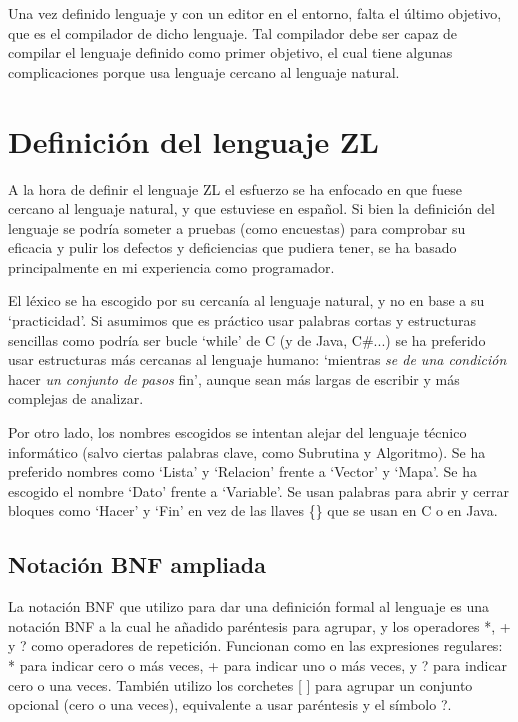 \documentclass{report}
\begin{document}
	\vspace{10px}
	
	Una vez definido lenguaje y  con un editor en el entorno, falta el último objetivo, que es el compilador de dicho lenguaje. Tal compilador debe ser capaz de compilar el lenguaje definido como primer objetivo, el cual tiene algunas complicaciones porque usa lenguaje cercano al lenguaje natural.
	
	\section{Definición del lenguaje ZL}
	
	A la hora de definir el lenguaje ZL el esfuerzo se ha enfocado en que fuese cercano al lenguaje natural, y que estuviese en español\cite{mundoingles}. Si bien la definición del lenguaje se podría someter a pruebas (como encuestas) para comprobar su eficacia y pulir los defectos y deficiencias que pudiera tener, se ha basado principalmente en mi experiencia como programador. 
	
	\vspace{10px}
	
	El léxico se ha escogido por su cercanía al lenguaje natural, y no en base a su `practicidad'. Si asumimos que es práctico usar palabras cortas y estructuras sencillas como podría ser bucle `while' de C (y de Java, C\#...) se ha preferido usar estructuras más cercanas al lenguaje humano: `mientras \textit{se de una condición} hacer \textit{un conjunto de pasos} fin', aunque sean más largas de escribir y más complejas de analizar.
	
	\vspace{10px}
	
	Por otro lado, los nombres escogidos se intentan alejar del lenguaje técnico informático (salvo ciertas palabras clave, como Subrutina y Algoritmo). Se ha preferido nombres como `Lista' y `Relacion' frente a `Vector' y `Mapa'. Se ha escogido el nombre `Dato' frente a `Variable'. Se usan palabras para abrir y cerrar bloques como `Hacer' y `Fin' en vez de las llaves \{\} que se usan en C o en Java. 
	
	\vspace{10px}
	
	\subsection{Notación BNF ampliada}
	
	La notación BNF que utilizo para dar una definición formal al lenguaje es una notación BNF a la cual he añadido paréntesis para agrupar, y los operadores *, + y ? como operadores de repetición. Funcionan como en las expresiones regulares: * para indicar cero o más veces, + para indicar uno o más veces, y ? para indicar cero o una veces. También utilizo los corchetes [
	] para agrupar un conjunto opcional (cero o una veces), equivalente a usar paréntesis y el símbolo ?.
	
\end{document}
